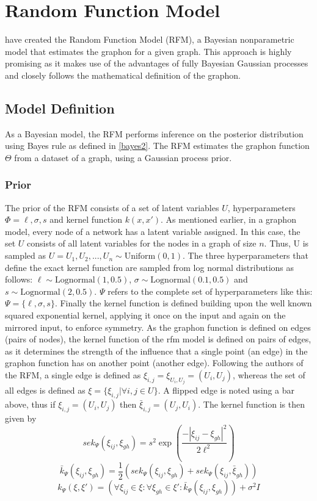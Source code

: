 \documentclass[11pt]{report} %
\begin{document}
\section{Random Function Model}
 have created the Random Function Model (RFM), a Bayesian nonparametric model that estimates the graphon for a given graph. This approach is highly promising as it makes use of the advantages of fully Bayesian Gaussian processes and closely follows the mathematical definition of the graphon.

\subsection{Model Definition}
As a Bayesian model, the RFM performs inference on the posterior distribution using Bayes rule as defined in \ref{bayes2}. The RFM estimates the graphon function $\Theta$ from a dataset of a graph, using a Gaussian process prior. 
\subsubsection{Prior}
The prior of the RFM consists of a set of latent variables $U$, hyperparameters $\Phi={\ell,\sigma,s}$ and kernel function $k(x,x')$. As mentioned earlier, in a graphon model, every node of a network has a latent variable assigned. In this case, the set $U$ consists of all latent variables for the nodes in a graph of size $n$. 
Thus, U is sampled as $U = {U_1,U_2,...,U_n} \sim \text{Uniform}(0,1)$. The three hyperparameters that define the exact kernel function are sampled from log normal distributions as follows:
$\ell \sim \text{Lognormal}(1,0.5) $, $ \sigma \sim \text{Lognormal}(0.1,0.5) $ and $s \sim \text{Lognormal}(2,0.5)$. $\Psi$ refers to the complete set of hyperparameters like this: $\Psi=\{\ell,\sigma,s\}$. Finally the kernel function is defined building upon the well known squared exponential kernel, applying it once on the input and again on the mirrored input, to enforce symmetry. As the graphon function is defined on edges (pairs of nodes), the kernel function of the rfm model is defined on pairs of edges, as it determines the strength of the influence that a single point (an edge) in the graphon function has on another point (another edge). Following the authors of the RFM, a single edge is defined as $\xi_{i,j}=\xi_{U_i,U_j}=(U_i, U_j)$, whereas the set of all edges is defined as $\xi = \{\xi_{i,j}|\forall i, j \in U \}$. A flipped edge is noted using a bar above, thus if $\xi_{i,j}=(U_i, U_j)$ then $\bar{\xi}_{i,j}=(U_j, U_i)$. The kernel function is then given by 
$$
sek_\Psi(\xi_{ij}, \xi_{gh}) = s^2\exp(\dfrac{-|\xi_{ij}-\xi_{gh}|^2}{2\ell^2}) $$
$$\bar{k}_\Psi(\xi_{ij}, \xi_{gh}) = \dfrac{1}{2}(sek_\Psi(\xi_{ij}, \xi_{gh}) + sek_\Psi(\xi_{ij}, \bar{\xi}_{gh}))$$
$$k_\Psi(\xi, \xi') = (\forall \xi_{ij} \in \xi: \forall \xi_{gh} \in \xi': \bar{k}_\Psi(\xi_{ij}, \xi_{gh}) )+ \sigma^2I $$
\end{document}
